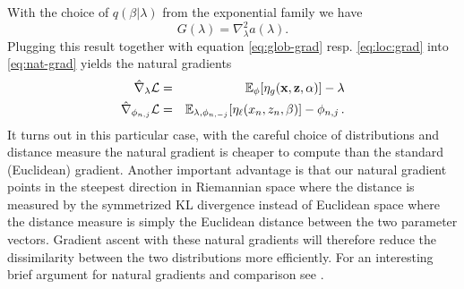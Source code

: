 \documentclass[12pt,abstracton,a4paper]{scrartcl}
\def\x{{\bf x}}
\def\z{{\bf z}}
\begin{document}
With the choice of $q(\beta|\lambda)$ from the exponential family we have 
\begin{equation}
G(\lambda) = \nabla^2_\lambda a(\lambda).
\end{equation}
Plugging this result together with equation \ref{eq:glob-grad} resp. \ref{eq:loc:grad} into \ref{eq:nat-grad} yields the natural gradients
\begin{eqnarray}
\hat\nabla_\lambda \mathcal L &=& 
 \mathbb E_\phi[\eta_g(\x,\z,\alpha)] - \lambda   \\
\hat\nabla_{\phi_{n,j}} \mathcal L &=& 
 \mathbb E_{\lambda,\phi_{n,-j}}[\eta_\ell(x_n,z_n,\beta)] - \phi_{n,j} \, .
\end{eqnarray}
It turns out in this particular case, with the careful choice of distributions and distance measure the natural gradient is cheaper to compute than the standard (Euclidean) gradient. Another important advantage is that our natural gradient points in the steepest direction in Riemannian space where the distance is measured by the symmetrized KL divergence instead of Euclidean space where the distance measure is simply the Euclidean distance between the two parameter vectors. Gradient ascent with these natural gradients will therefore reduce the dissimilarity between the two distributions more efficiently. For an interesting brief argument for natural gradients and comparison see \cite{Amari98}.






\printbibliography
\end{document}
